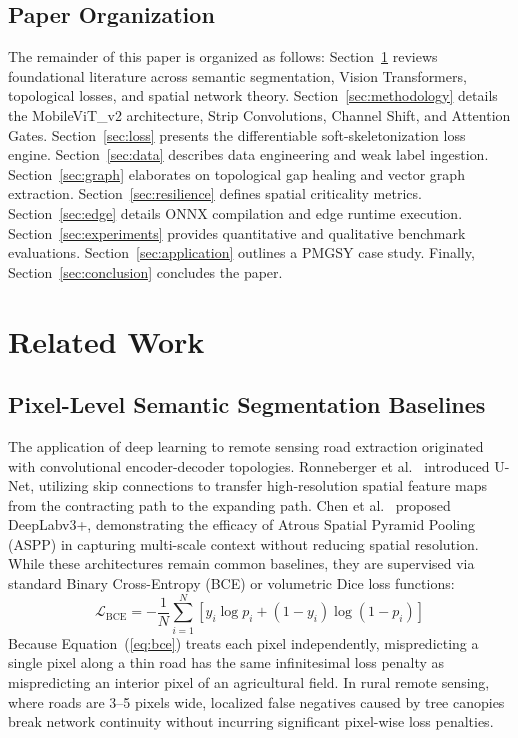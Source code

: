 \documentclass[conference]{IEEEtran}
\begin{document}
\subsection{Paper Organization}
The remainder of this paper is organized as follows: Section~\ref{sec:related_work} reviews foundational literature across semantic segmentation, Vision Transformers, topological losses, and spatial network theory. Section~\ref{sec:methodology} details the MobileViT\_v2 architecture, Strip Convolutions, Channel Shift, and Attention Gates. Section~\ref{sec:loss} presents the differentiable soft-skeletonization loss engine. Section~\ref{sec:data} describes data engineering and weak label ingestion. Section~\ref{sec:graph} elaborates on topological gap healing and vector graph extraction. Section~\ref{sec:resilience} defines spatial criticality metrics. Section~\ref{sec:edge} details ONNX compilation and edge runtime execution. Section~\ref{sec:experiments} provides quantitative and qualitative benchmark evaluations. Section~\ref{sec:application} outlines a PMGSY case study. Finally, Section~\ref{sec:conclusion} concludes the paper.

\section{Related Work}
\label{sec:related_work}

\subsection{Pixel-Level Semantic Segmentation Baselines}
The application of deep learning to remote sensing road extraction originated with convolutional encoder-decoder topologies. Ronneberger et al.~\cite{ronneberger2015unet} introduced U-Net, utilizing skip connections to transfer high-resolution spatial feature maps from the contracting path to the expanding path. Chen et al.~\cite{chen2017deeplab} proposed DeepLabv3+, demonstrating the efficacy of Atrous Spatial Pyramid Pooling (ASPP) in capturing multi-scale context without reducing spatial resolution. While these architectures remain common baselines, they are supervised via standard Binary Cross-Entropy (BCE) or volumetric Dice loss functions:
\begin{equation}
    \mathcal{L}_{\text{BCE}} = -\frac{1}{N} \sum_{i=1}^N \left[ y_i \log p_i + (1 - y_i) \log(1 - p_i) \right]
    \label{eq:bce}
\end{equation}
Because Equation~(\ref{eq:bce}) treats each pixel independently, mispredicting a single pixel along a thin road has the same infinitesimal loss penalty as mispredicting an interior pixel of an agricultural field. In rural remote sensing, where roads are 3--5 pixels wide, localized false negatives caused by tree canopies break network continuity without incurring significant pixel-wise loss penalties.
\end{document}
